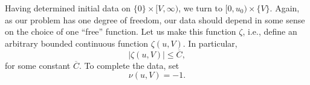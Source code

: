 \documentclass{article}
\begin{document}


Having determined initial data on $\{0\}\times[V,\infty)$, we turn to
$[0,u_0)\times\{V\}$. Again, as our problem has one degree of freedom,
our data should depend in some sense on the choice of one ``free'' function.
Let us make this function $\zeta$, i.e., define
an arbitrary bounded continuous function $\zeta(u,V)$. In particular,
\begin{equation}
\label{INITu1}
|\zeta(u,V)|\le \overline{C},
\end{equation}
for some constant $\overline{C}$.
To complete the data, set
\begin{equation}
\label{INITu2}
\nu(u,V)=-1.
\end{equation}
\end{document}
